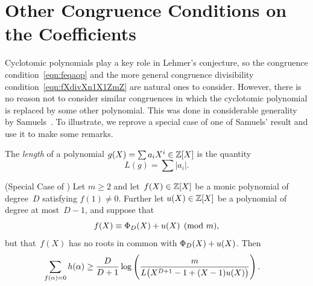 \documentclass[12pt,reqno]{amsart}
\begin{document}
\section{Other Congruence Conditions on the Coefficients}
\label{section:coefcong}

Cyclotomic polynomials play a key role in Lehmer's conjecture, so the
congruence condition~\eqref{eqn:feqaop} and the more general
congruence divisibility condition~\eqref{eqn:fXdivXn1X1ZmZ} are
natural ones to consider. However, there is no reason not to consider
similar congruences in which the cyclotomic polynomial is replaced by
some other polynomial.  This was done in considerable generality by
Samuels~\cite{MR2313990}. To illustrate, we reprove a special
case of one of Samuels' result and use it to make some remarks.


\begin{definition}
The \emph{length} of a polynomial $g(X)=\sum a_iX^i\in\mathbb{Z}[X]$ is the
quantity
\[
  L(g) = \sum |a_i|.
\]
\end{definition}

\begin{theorem}
\label{thm:othercongruences}
\textup{(Special Case of \cite[Corollary~5.3]{MR2313990})}
Let $m\ge2$ and let~$f(X)\in\mathbb{Z}[X]$ be a monic polynomial of
degree~$D$ satisfying $f(1)\ne0$. Further let $u(X)\in\mathbb{Z}[X]$
be a polynomial of degree at most~$D-1$, and suppose that
\[
  f(X)\equiv \Phi_D(X) + u(X) \pmod{m},
\]
but that~$f(X)$ has no roots in common with $\Phi_D(X)+u(X)$. Then
\begin{align*}
  \sum_{f(\alpha)=0} h(\alpha) 
  &\ge \frac{D}{D+1}
            \log\left(\frac{m}{L\bigl(X^{D+1}-1+(X-1)u(X)\bigr)}\right).
\end{align*}
\end{theorem}
\end{document}
